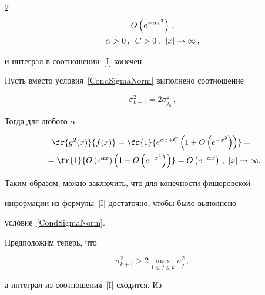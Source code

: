 \begin{multicols}{2}
\begin{multline*}
O\left(e^{-\alpha x^2}\right)\,,\\

\alpha>0\,,\enskip C>0\,,\enskip  |x|\to\infty\,,

\end{multline*}

и интеграл в соотношении~\eqref{I} конечен.




Пусть вместо условия~\eqref{CondSigmaNorm} выполнено соотношение

$$

\sigma_{k+1}^2=2\sigma_{j_0}^2\,,

$$



\columnbreak





\noindent

Тогда для любого $\alpha$

\begin{multline*}

\fr{g^2(x)}{f(x)} =\fr{1}{e^{\alpha x+C}

\left(1+O\left(e^{-x^2}\right)\right)}={}\\

{}=\fr{1}{O\left(e^{\alpha

x}\right)\left(1+O\left(e^{-x^2}\right)\right)}=O\left(e^{-\alpha

x}\right)\,,\ |x|\to\infty.\hspace*{-2.57826pt}

\end{multline*}



Таким образом, можно заключить, что для конечности фишеровской

информации из формулы~\eqref{I} достаточно, чтобы было выполнено

условие~\eqref{CondSigmaNorm}.



Предположим теперь, что

\begin{equation}

\label{invCondSigmaNorm}

\sigma_{k+1}^2>2\max_{1\le j\le

k}\sigma_j^2\,,

\end{equation}

а интеграл из соотношения~\eqref{I} сходится. Из


\end{multicols}
